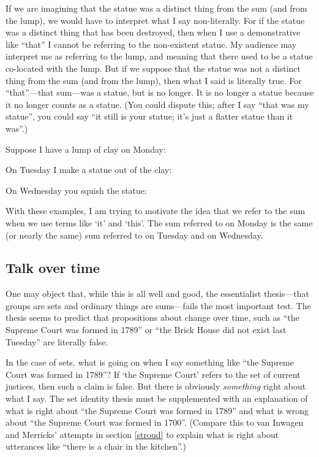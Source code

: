 \documentclass[11pt]{article}
\begin{document}
\begin{spacing}{1.5}
\begin{enumerate}
    If we are imagining that the statue was a distinct thing from the
    sum (and from the lump), we would have to interpret what I say
    non-literally.  For if the statue was a distinct thing that has
    been destroyed, then when I use a demonstrative like ``that'' I
    cannot be referring to the non-existent statue.  My audience may
    interpret me as referring to the lump, and meaning that there used
    to be a statue co-located with the lump.  But if we suppose that
    the statue was not a distinct thing from the sum (and from the
    lump), then what I said is literally true.  For ``that''---that
    sum---was a statue, but is no longer.  It is no longer a statue
    because it no longer counts as a statue.  (You could dispute this;
    after I say ``that was my statue'', you could say ``it still is
    your statue; it's just a flatter statue than it was''.)

    Suppose I have a lump of clay on Monday:


    On Tuesday I make a statue out of the clay:


    On Wednesday you squish the statue:

\end{enumerate}

With these examples, I am trying to motivate the idea that we refer to
the sum when we use terms like `it' and `this'.  The sum referred to
on Monday is the same (or nearly the same) sum referred to on Tuesday
and on Wednesday.

\subsection{Talk over time}
\label{time-talk}
One may object that, while this is all well and good, the essentialist
thesis---that groups are sets and ordinary things are sums---fails the
most important test.  The thesis seems to predict that propositions
about change over time, such as ``the Supreme Court was formed in
1789'' or ``the Brick House did not exist last Tuesday'' are literally
false.

In the case of sets, what is going on when I say something like ``the
Supreme Court was formed in 1789''?  If `the Supreme Court' refers to
the set of current justices, then such a claim is false.  But there is
obviously {\em something} right about what I say.  The set identity
thesis must be supplemented with an explanation of what is right about
``the Supreme Court was formed in 1789'' and what is wrong about ``the
Supreme Court was formed in 1700''.  (Compare this to van Inwagen and
Merricks' attempts in section \ref{stroud} to explain what is right
about utterances like ``there is a chair in the kitchen''.)


\end{spacing}
\end{document}
